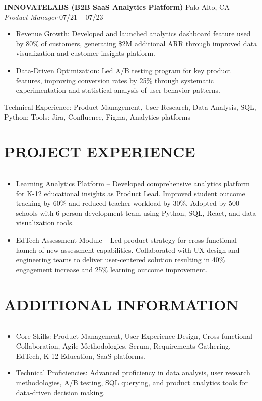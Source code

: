 \documentclass[10pt,letterpaper]{article}
\newcommand{\sectionline}{\par\vspace{-0.5em}\noindent\rule{\textwidth}{0.6pt}\vspace{0.3em}\par}
\begin{document}
\noindent\textbf{INNOVATELABS (B2B SaaS Analytics Platform)} \hfill Palo Alto, CA\\
\textit{Product Manager} \hfill 07/21 -- 07/23
\begin{itemize}
  \item Revenue Growth: Developed and launched analytics dashboard feature used by 80\% of customers, generating \$2M additional ARR through improved data visualization and customer insights platform.
  \item Data-Driven Optimization: Led A/B testing program for key product features, improving conversion rates by 25\% through systematic experimentation and statistical analysis of user behavior patterns.
\end{itemize}
Technical Experience: Product Management, User Research, Data Analysis, SQL, Python; Tools: Jira, Confluence, Figma, Analytics platforms

\section*{PROJECT EXPERIENCE}
\sectionline

\begin{itemize}
  \item Learning Analytics Platform -- Developed comprehensive analytics platform for K-12 educational insights as Product Lead. Improved student outcome tracking by 60\% and reduced teacher workload by 30\%. Adopted by 500+ schools with 6-person development team using Python, SQL, React, and data visualization tools.
  \item EdTech Assessment Module -- Led product strategy for cross-functional launch of new assessment capabilities. Collaborated with UX design and engineering teams to deliver user-centered solution resulting in 40\% engagement increase and 25\% learning outcome improvement.
\end{itemize}

\section*{ADDITIONAL INFORMATION}
\sectionline

\begin{itemize}
  \item Core Skills: Product Management, User Experience Design, Cross-functional Collaboration, Agile Methodologies, Scrum, Requirements Gathering, EdTech, K-12 Education, SaaS platforms.
  \item Technical Proficiencies: Advanced proficiency in data analysis, user research methodologies, A/B testing, SQL querying, and product analytics tools for data-driven decision making.
\end{itemize}
\end{document}
